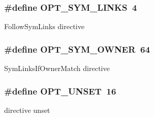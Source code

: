 \subsubsection[{\texorpdfstring{O\+P\+T\+\_\+\+S\+Y\+M\+\_\+\+L\+I\+N\+KS}{OPT_SYM_LINKS}}]{\setlength{\rightskip}{0pt plus 5cm}\#define O\+P\+T\+\_\+\+S\+Y\+M\+\_\+\+L\+I\+N\+KS~4}\hypertarget{group__APACHE__CORE__HTTPD__ACESSORS_ga33b66321dd597ece719badc8bb7b6035}{}\label{group__APACHE__CORE__HTTPD__ACESSORS_ga33b66321dd597ece719badc8bb7b6035}
Follow\+Sym\+Links directive 
\subsubsection[{\texorpdfstring{O\+P\+T\+\_\+\+S\+Y\+M\+\_\+\+O\+W\+N\+ER}{OPT_SYM_OWNER}}]{\setlength{\rightskip}{0pt plus 5cm}\#define O\+P\+T\+\_\+\+S\+Y\+M\+\_\+\+O\+W\+N\+ER~64}\hypertarget{group__APACHE__CORE__HTTPD__ACESSORS_ga168575af5f7cf32e2d69a9d51701adff}{}\label{group__APACHE__CORE__HTTPD__ACESSORS_ga168575af5f7cf32e2d69a9d51701adff}
Sym\+Links\+If\+Owner\+Match directive 
\subsubsection[{\texorpdfstring{O\+P\+T\+\_\+\+U\+N\+S\+ET}{OPT_UNSET}}]{\setlength{\rightskip}{0pt plus 5cm}\#define O\+P\+T\+\_\+\+U\+N\+S\+ET~16}\hypertarget{group__APACHE__CORE__HTTPD__ACESSORS_ga5c62c4311a0c60c9fa36d109f4bf9004}{}\label{group__APACHE__CORE__HTTPD__ACESSORS_ga5c62c4311a0c60c9fa36d109f4bf9004}
directive unset 